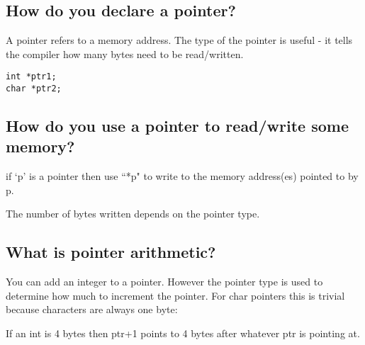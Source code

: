 \subsection{How do you declare a
pointer?}\label{how-do-you-declare-a-pointer}

A pointer refers to a memory address. The type of the pointer is useful
- it tells the compiler how many bytes need to be read/written.

\begin{verbatim}
int *ptr1;
char *ptr2;
\end{verbatim}

\subsection{How do you use a pointer to read/write some
memory?}\label{how-do-you-use-a-pointer-to-readwrite-some-memory}

if `p' is a pointer then use ``*p" to write to the memory address(es)
pointed to by p.

\begin{Shaded}
\begin{Highlighting}[]
\NormalTok{; }
\end{Highlighting}
\end{Shaded}

The number of bytes written depends on the pointer type.

\subsection{What is pointer
arithmetic?}\label{what-is-pointer-arithmetic}

You can add an integer to a pointer. However the pointer type is used to
determine how much to increment the pointer. For char pointers this is
trivial because characters are always one byte:

\begin{Shaded}
\begin{Highlighting}[]
 \NormalTok{; }
\NormalTok{; }
\end{Highlighting}
\end{Shaded}

If an int is 4 bytes then ptr+1 points to 4 bytes after whatever ptr is
pointing at.

